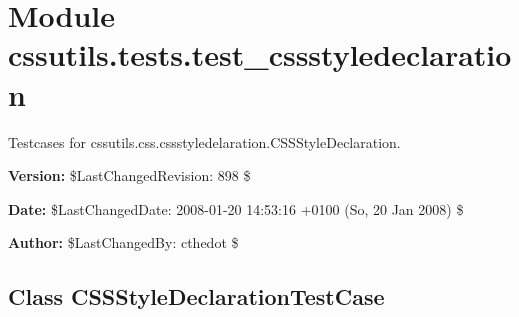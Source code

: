 %
%
%


\section{Module cssutils.tests.test\_cssstyledeclaration}

    \label{cssutils:tests:test_cssstyledeclaration}
Testcases for cssutils.css.cssstyledelaration.CSSStyleDeclaration.

\textbf{Version:} \$LastChangedRevision: 898 \$



\textbf{Date:} \$LastChangedDate: 2008-01-20 14:53:16 +0100 (So, 20 Jan 2008) \$



\textbf{Author:} \$LastChangedBy: cthedot \$





\subsection{Class CSSStyleDeclarationTestCase}

